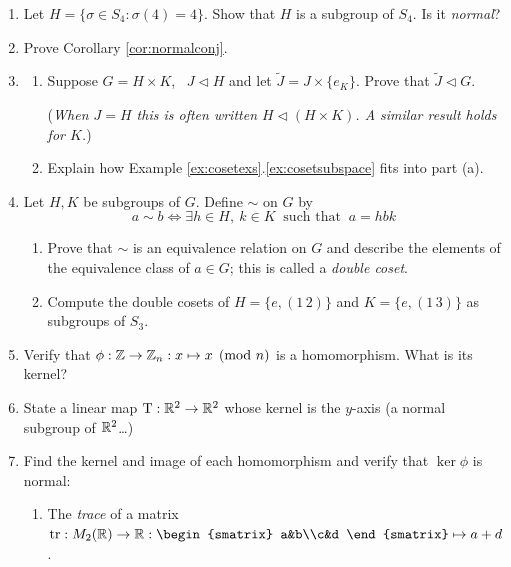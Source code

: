 \begin{exercises}{}{}
\begin{enumerate}
	
		\item Let $H=\{\sigma\in S_4:\sigma(4)=4\}$. Show that $H$ is a subgroup of $S_4$. Is it \emph{normal}?
		
		
		\item Prove Corollary \ref{cor:normalconj}.
	  
	  
	  \item\label{exs:directprodfactor}\begin{enumerate}
	    \item Suppose $G=H\times K$, \ $J\triangleleft H$ and let $\widetilde J=J\times\{e_K\}$. Prove that $\widetilde J\triangleleft G$.\par
	    (\emph{When $J=H$ this is often written $H\triangleleft (H\times K)$. A similar result holds for $K$.})
	    \item Explain how Example \ref*{ex:cosetexs}.\ref{ex:cosetsubspace} fits into part (a).
	  \end{enumerate} 
	  
		
		\item Let $H,K$ be subgroups of $G$. Define $\sim$ on $G$ by
		\[
			a\sim b\iff \exists h\in H,\ k\in K \ \text{ such that }\ a=hb k
		\]
		\begin{enumerate}
	  	\item Prove that $\sim$ is an equivalence relation on $G$ and describe the elements of the equivalence class of $a\in G$; this is called a \emph{double coset}.
	  	\item Compute the double cosets of $H=\{e,(1\,2)\}$ and $K=\{e,(1\,3)\}$ as subgroups of $S_3$. 
		\end{enumerate}
		
		
		\item Verify that $\phi:\mathbb{Z}\to\mathbb{Z}_n:x\mapsto x\pmod n$ is a homomorphism. What is its kernel? 
			
		\item State a linear map $\mathrm{T}:\mathbb{R}^2\to\mathbb{R}^2$ whose kernel is the $y$-axis (a normal subgroup of $\mathbb{R}^2$\ldots)
		
		
		\item Find the kernel and image of each homomorphism and verify that $\ker\phi$ is normal:
		\begin{enumerate}
		  \item The \emph{trace} of a matrix $\tr:M_2(\R)\to\R:
		  \smash{
			  \begin{smatrix}
					a&b\\c&d
			  \end{smatrix}
		  }
		  \mapsto a+d$.
			

\end{enumerate}
\end{enumerate}
\end{exercises}
